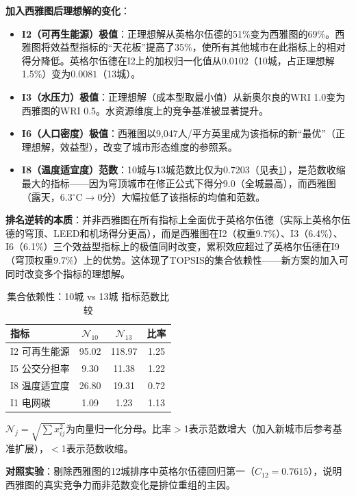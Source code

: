 \documentclass[12pt]{ctexart}
\begin{document}
\textbf{加入西雅图后理想解的变化}：
\begin{itemize}[itemsep=0.1em]
  \item \textbf{I2（可再生能源）极值}：正理想解从英格尔伍德的51\%变为西雅图的69\%。西雅图将效益型指标的``天花板''提高了35\%，使所有其他城市在此指标上的相对得分降低。英格尔伍德在I2上的加权归一化值从$0.0102$（10城，占正理想解1.5\%）变为$0.0081$（13城）。
  \item \textbf{I3（水压力）极值}：正理想解（成本型取最小值）从新奥尔良的WRI 1.0变为西雅图的WRI 0.5。水资源维度上的竞争基准被显著提升。
  \item \textbf{I6（人口密度）极值}：西雅图以9,047人/平方英里成为该指标的新``最优''（正理想解，效益型），改变了城市形态维度的参照系。
  \item \textbf{I8（温度适宜度）范数}：10城与13城范数比仅为0.7203（见表\ref{tab:set_dependency}），是范数收缩最大的指标——因为穹顶城市在修正公式下得分9.0（全城最高），而西雅图（露天，6.3$^\circ$C$\to$0分）大幅拉低了该指标的均值和范数。
\end{itemize}

\textbf{排名逆转的本质}：并非西雅图在所有指标上全面优于英格尔伍德（实际上英格尔伍德的穹顶、LEED和机场得分更高），而是西雅图在I2（权重9.7\%）、I3（6.4\%）、I6（6.1\%）三个效益型指标上的极值同时改变，累积效应超过了英格尔伍德在I9（穹顶权重9.7\%）上的优势。这体现了TOPSIS的集合依赖性——新方案的加入可同时改变多个指标的理想解。

\begin{table}[H]
\centering
\caption{集合依赖性：10城 vs 13城 指标范数比较}
\label{tab:set_dependency}
\small
\begin{tabular}{lccc}
\toprule
\textbf{指标} & \textbf{$\mathcal{N}_{10}$} & \textbf{$\mathcal{N}_{13}$} & \textbf{比率} \\
\midrule
I2 可再生能源 & 95.02 & 118.97 & 1.25 \\
I5 公交分担率 & 9.30 & 11.38 & 1.22 \\
I8 温度适宜度 & 26.80 & 19.31 & 0.72 \\
I1 电网碳 & 1.09 & 1.23 & 1.13 \\
\bottomrule
\end{tabular}
\par\vspace{0.3em}\footnotesize
$\mathcal{N}_j=\sqrt{\sum x_{ij}^2}$为向量归一化分母。比率$>$1表示范数增大（加入新城市后参考基准扩展），$<$1表示范数收缩。
\end{table}

\textbf{对照实验}：剔除西雅图的12城排序中英格尔伍德回归第一（$C_{12}=0.7615$），说明西雅图的真实竞争力而非范数变化是排位重组的主因。
\end{document}
